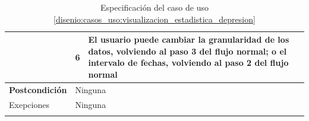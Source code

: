 \begin{table}[h]
\begin{tabularx}{\textwidth}{|l|l|X|}
                    \cline{2-3} & 6 & El usuario puede cambiar la granularidad de los datos, volviendo al paso 3 del flujo normal; o el intervalo de fechas, volviendo al paso 2 del flujo normal \\
                    \hline
                    \textbf{Postcondición} & \multicolumn{2}{|X|}{Ninguna} \\
                    \hline
                    Exepciones & \multicolumn{2}{|X|}{Ninguna} \\
                    \hline
                    \caption{Especificación del caso de uso \ref{disenio:casos_uso:visualizacion_estadistica_depresion}}
                    \label{tabla:casos_uso:visualizacion_estadistica_depresion}
                \end{tabularx}
            \end{table}
            
